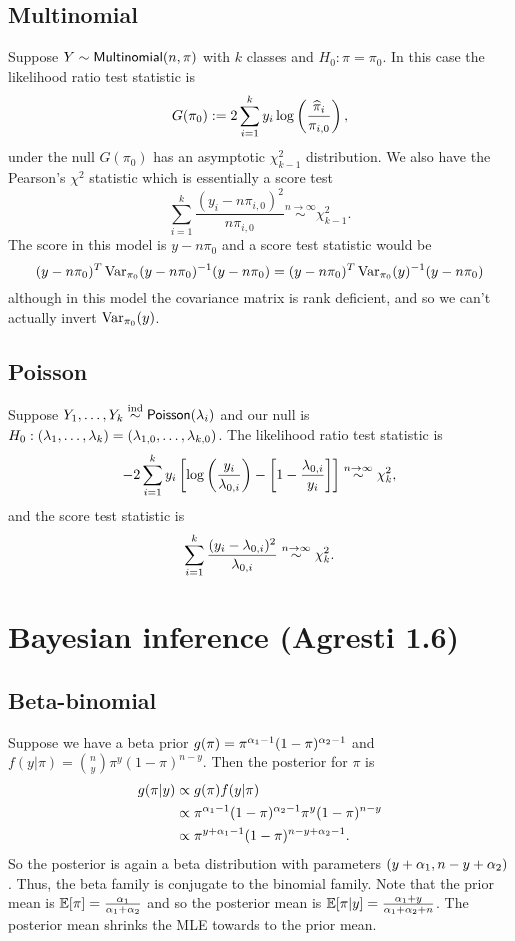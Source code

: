 \subsection{Multinomial}
Suppose $Y \sim \mathsf{Multinomial}(n,\pi)$ with $k$ classes and $H_0:\pi=\pi_0$. In this case the likelihood ratio test statistic is
\[G(\pi_0) := 2\sum_{i=1}^k y_i \log\left(\frac{\widehat{\pi}_i}{\pi_{i,0}}\right),\]
under the null $G(\pi_0)$ has an asymptotic $\chi^2_{k-1}$ distribution. We also have the Pearson's $\chi^2$ statistic which is essentially a score test
\[\sum_{i=1}^k \frac{(y_i-n\pi_{i,0})^2}{n\pi_{i,0}} \stackrel{n \to \infty}{\sim} \chi^2_{k-1}.\]
The score in this model is $y - n \pi_0$ and a score test statistic would be \[(y-n\pi_0)^T\operatorname{Var}_{\pi_0}(y-n\pi_0)^{-1}(y-n\pi_0) =(y-n\pi_0)^T\operatorname{Var}_{\pi_0}(y)^{-1}(y-n\pi_0) \] although in this model the covariance matrix is rank deficient, and so we can't actually invert $\operatorname{Var}_{\pi_0}(y)$. 
\subsection{Poisson}
Suppose $Y_1,\ldots,Y_k \stackrel{\text{ind}}{\sim} \mathsf{Poisson}(\lambda_i)$ and our null is $H_0:(\lambda_1,\ldots,\lambda_k)=(\lambda_{1,0},\ldots,\lambda_{k,0})$. The likelihood ratio test statistic is
\[-2\sum_{i=1}^k y_i\left[\log\left(\frac{y_i}{\lambda_{0,i}}\right)-\left[1-\frac{\lambda_{0,i}}{y_i}\right]\right] \stackrel{n \to \infty}{\sim} \chi^2_k, \]
and the score test statistic is
\[\sum_{i=1}^k \frac{(y_i-\lambda_{0,i})^2}{\lambda_{0,i}}  \stackrel{n \to \infty}{\sim}\chi^2_k.  \]
\section{Bayesian inference (Agresti 1.6)}
\subsection{Beta-binomial}
Suppose we have a beta prior $g(\pi) = \pi^{{\alpha}_1-1}(1-\pi)^{{\alpha}_2-1}$ and $f(y|\pi) = \binom{n}{y}\pi^y(1-\pi)^{n-y}$. Then the posterior for $\pi$ is
\begin{align*}
    g(\pi|y) &\propto g(\pi)f(y|\pi)\\
    &\propto \pi^{{\alpha}_1-1}(1-\pi)^{{\alpha}_2-1}\pi^y(1-\pi)^{n-y}\\
    &\propto \pi^{y+{\alpha}_1-1}(1-\pi)^{n-y+{\alpha}_2-1}.
\end{align*}
So the posterior is again a beta distribution with parameters $(y+{\alpha}_1, n-y+{\alpha}_2)$. Thus, the beta family is conjugate to the binomial family. Note that the prior mean is ${\mathbb{E}}[\pi] = \frac{{\alpha}_1}{{\alpha}_1+{\alpha}_2}$ and so the posterior mean is ${\mathbb{E}}[\pi|y] = \frac{{\alpha}_1+y}{{\alpha}_1+{\alpha}_2+n}$. The posterior mean shrinks the MLE towards to the prior mean.
